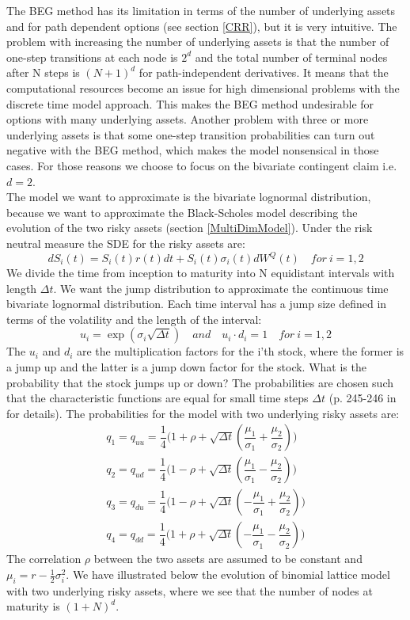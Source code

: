 The BEG method has its limitation in terms of the number of underlying assets and for path dependent options (see section \ref{CRR}), but it is very intuitive. The problem with increasing the number of underlying assets is that the number of one-step transitions at each node is $2^d$ and the total number of terminal nodes after N steps is $(N+1)^d$ for path-independent derivatives. It means that the computational resources become an issue for high dimensional problems with the discrete time model approach. This makes the BEG method undesirable for options with many underlying assets. Another problem with three or more underlying assets is that some one-step transition probabilities can turn out negative with the BEG method, which makes the model nonsensical in those cases. For those reasons we choose to focus on the bivariate contingent claim i.e. $d=2$. \\

The model we want to approximate is the bivariate lognormal distribution, because we want to approximate the Black-Scholes model describing the evolution of the two risky assets (section \ref{MultiDimModel}). Under the risk neutral measure the SDE for the risky assets are:
$$dS_i(t)=S_i(t)r(t)dt+S_i(t)\sigma_i(t)dW^Q(t) \quad for \ i=1,2$$
We divide the time from inception to maturity into N equidistant intervals with length $\Delta t$. We want the jump distribution to approximate the continuous time bivariate lognormal distribution. Each time interval has a jump size defined in terms of the volatility and the length of the interval:
$$u_i=\exp(\sigma_i \sqrt{\Delta t}) \quad and \quad u_i \cdot d_i = 1 \quad for \ i=1,2$$
The $u_i$ and $d_i$ are the multiplication factors for the i'th stock, where the former is a jump up and the latter is a jump down factor for the stock. What is the probability that the stock jumps up or down? The probabilities are chosen such that the characteristic functions are equal for small time steps $\Delta t$ (p. 245-246 in \parencite{BEG} for details). The probabilities for the model with two underlying risky assets are:
\begin{equation}
\begin{split}
q_1=q_{uu}=\dfrac{1}{4}\bigg( 1+\rho + \sqrt{\Delta t}(\dfrac{\mu_1}{\sigma_1} + \dfrac{\mu_2}{\sigma_2}) \bigg)\\
q_2=q_{ud}=\dfrac{1}{4}\bigg( 1-\rho + \sqrt{\Delta t}(\dfrac{\mu_1}{\sigma_1} - \dfrac{\mu_2}{\sigma_2}) \bigg)\\
q_3=q_{du}=\dfrac{1}{4}\bigg( 1-\rho + \sqrt{\Delta t}(-\dfrac{\mu_1}{\sigma_1} + \dfrac{\mu_2}{\sigma_2}) \bigg)\\
q_4=q_{dd}=\dfrac{1}{4}\bigg( 1+\rho + \sqrt{\Delta t}(-\dfrac{\mu_1}{\sigma_1} - \dfrac{\mu_2}{\sigma_2}) \bigg)
\end{split}
\end{equation} 
The correlation $\rho$ between the two assets are assumed to be constant and $\mu_i=r-\frac{1}{2}\sigma_i^2$. We have illustrated below the evolution of binomial lattice model with two underlying risky assets, where we see that the number of nodes at maturity is $(1+N)^d$. 

